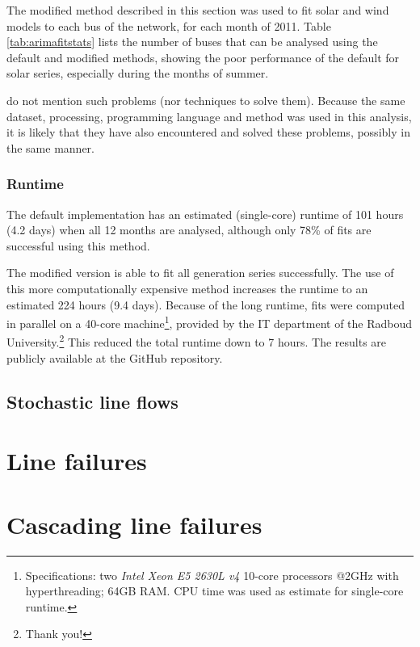 \documentclass[main.tex]{subfiles}
\begin{document}
The modified method described in this section was used to fit solar and wind models to each bus of the network, for each month of 2011. Table \ref{tab:arimafitstats} lists the number of buses that can be analysed using the default and modified methods, showing the poor performance of the default for solar series, especially during the months of summer.

\citet{Nesti2018emergentfailures} do not mention such problems (nor techniques to solve them). Because the same dataset, processing, programming language and method was used in this analysis, it is likely that they have also encountered and solved these problems, possibly in the same manner.

\subsubsection{Runtime}
The default implementation has an estimated (single-core) runtime of 101 hours (4.2 days) when all 12 months are analysed, although only 78\% of fits are successful using this method.

The modified version is able to fit all generation series successfully. The use of this more computationally expensive method increases the runtime to an estimated 224 hours (9.4 days). Because of the long runtime, fits were computed in parallel on a 40-core machine\footnote{Specifications: two \textit{Intel Xeon E5 2630L v4} 10-core processors @2GHz with hyperthreading; 64GB RAM. CPU time was used as estimate for single-core runtime.}, provided by the IT department of the Radboud University.\footnote{Thank you!} This reduced the total runtime down to 7 hours. The results are publicly available at the GitHub repository.

\subsection{Stochastic line flows}

\section{Line failures}
\section{Cascading line failures}
\end{document}
